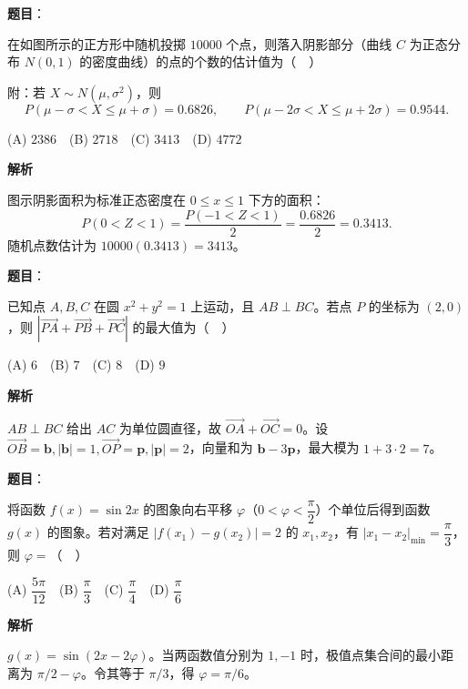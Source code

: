 \begin{answer}

\textbf{题目}：

在如图所示的正方形中随机投掷 \(10000\) 个点，则落入阴影部分（曲线 \(C\) 为正态分布 \(N(0,1)\) 的密度曲线）的点的个数的估计值为（　）

附：若 \(X\sim N(\mu,\sigma^2)\)，则
\nopagebreak[4]
\[
P(\mu-\sigma<X\leqslant\mu+\sigma)=0.6826,\qquad
P(\mu-2\sigma<X\leqslant\mu+2\sigma)=0.9544.
\]
\nopagebreak[4]
\begin{center}\end{center}
\nopagebreak[4]
(A) \(2386\)　(B) \(2718\)　(C) \(3413\)　(D) \(4772\)

\textbf{解析}

图示阴影面积为标准正态密度在 \(0\le x\le1\) 下方的面积：
\nopagebreak[4]
\[
P(0<Z<1)=\frac{P(-1<Z<1)}2=\frac{0.6826}2=0.3413.
\]
随机点数估计为 \(10000(0.3413)=3413\)。


\end{answer}
\begin{answer}

\textbf{题目}：

已知点 \(A,B,C\) 在圆 \(x^2+y^2=1\) 上运动，且 \(AB\perp BC\)。若点 \(P\) 的坐标为 \((2,0)\)，则 \(\left|\overrightarrow{PA}+\overrightarrow{PB}+\overrightarrow{PC}\right|\) 的最大值为（　）

(A) \(6\)　(B) \(7\)　(C) \(8\)　(D) \(9\)

\textbf{解析}

\(AB\perp BC\) 给出 \(AC\) 为单位圆直径，故 \(\vec{OA}+\vec{OC}=0\)。设 \(\vec{OB}=\mathbf b,|\mathbf b|=1,\vec{OP}=\mathbf p,|\mathbf p|=2\)，向量和为 \(\mathbf b-3\mathbf p\)，最大模为 \(1+3\cdot2=7\)。


\end{answer}
\begin{answer}

\textbf{题目}：

将函数 \(f(x)=\sin 2x\) 的图象向右平移 \(\varphi\)（\(0<\varphi<\dfrac{\pi}{2}\)）个单位后得到函数 \(g(x)\) 的图象。若对满足 \(\lvert f(x_1)-g(x_2)\rvert=2\) 的 \(x_1,x_2\)，有 \(\lvert x_1-x_2\rvert_{\min}=\dfrac{\pi}{3}\)，则 \(\varphi=\)（　）

(A) \(\dfrac{5\pi}{12}\)　(B) \(\dfrac{\pi}{3}\)　(C) \(\dfrac{\pi}{4}\)　(D) \(\dfrac{\pi}{6}\)

\textbf{解析}

\(g(x)=\sin(2x-2\varphi)\)。当两函数值分别为 \(1,-1\) 时，极值点集合间的最小距离为 \(\pi/2-\varphi\)。令其等于 \(\pi/3\)，得 \(\varphi=\pi/6\)。


\end{answer}
